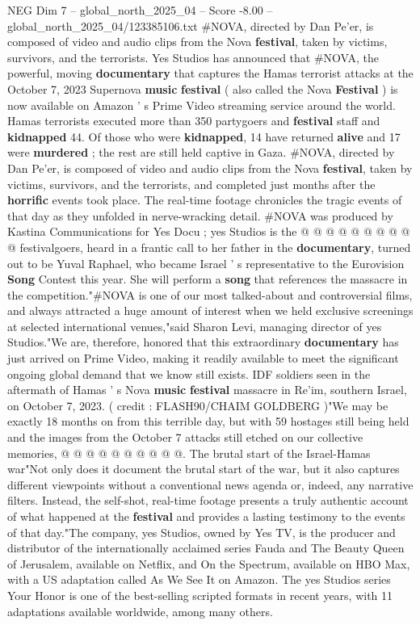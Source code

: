 \begin{textsample}{NEG Dim 7 – global\_north\_2025\_04 – Score -8.00 – global\_north\_2025\_04/123385106.txt}  \label{ex:f7_neg_093}
\#NOVA, directed by Dan Pe'er, is composed of video and audio clips from the Nova \textbf{festival}, taken by victims, survivors, and the terrorists.
Yes Studios has announced that \#NOVA, the powerful, moving \textbf{documentary} that captures the Hamas terrorist attacks at the October 7, 2023 Supernova \textbf{music} \textbf{festival} ( also called the Nova \textbf{Festival} ) is now available on Amazon ' s Prime Video streaming service around the world.
Hamas terrorists executed more than 350 partygoers and \textbf{festival} staff and \textbf{kidnapped} 44.
Of those who were \textbf{kidnapped}, 14 have returned \textbf{alive} and 17 were \textbf{murdered} ; the rest are still held captive in Gaza. \#NOVA, directed by Dan Pe'er, is composed of video and audio clips from the Nova \textbf{festival}, taken by victims, survivors, and the terrorists, and completed just months after the \textbf{horrific} events took place.
The real-time footage chronicles the tragic events of that day as they unfolded in nerve-wracking detail. \#NOVA was produced by Kastina Communications for Yes Docu ; yes Studios is the @ @ @ @ @ @ @ @ @ @ festivalgoers, heard in a frantic call to her father in the \textbf{documentary}, turned out to be Yuval Raphael, who became Israel ' s representative to the Eurovision \textbf{Song} Contest this year.
She will perform a \textbf{song} that references the massacre in the competition."\#NOVA is one of our most talked-about and controversial films, and always attracted a huge amount of interest when we held exclusive screenings at selected international venues,"said Sharon Levi, managing director of yes Studios."We are, therefore, honored that this extraordinary \textbf{documentary} has just arrived on Prime Video, making it readily available to meet the significant ongoing global demand that we know still exists.
IDF soldiers seen in the aftermath of Hamas ' s Nova \textbf{music} \textbf{festival} massacre in Re'im, southern Israel, on October 7, 2023. ( credit : FLASH90/CHAIM GOLDBERG )"We may be exactly 18 months on from this terrible day, but with 59 hostages still being held and the images from the October 7 attacks still etched on our collective memories, @ @ @ @ @ @ @ @ @ @.
The brutal start of the Israel-Hamas war"Not only does it document the brutal start of the war, but it also captures different viewpoints without a conventional news agenda or, indeed, any narrative filters.
Instead, the self-shot, real-time footage presents a truly authentic account of what happened at the \textbf{festival} and provides a lasting testimony to the events of that day."The company, yes Studios, owned by Yes TV, is the producer and distributor of the internationally acclaimed series Fauda and The Beauty Queen of Jerusalem, available on Netflix, and On the Spectrum, available on HBO Max, with a US adaptation called As We See It on Amazon.
The yes Studios series Your Honor is one of the best-selling scripted formats in recent years, with 11 adaptations available worldwide, among many others.

\end{textsample}
